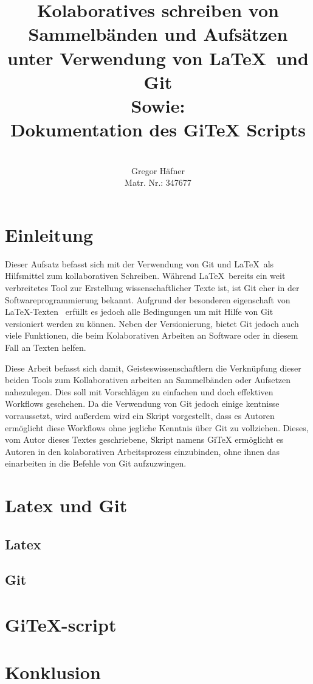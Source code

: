 \documentclass[12pt,a4paper]{scrartcl}
\author{\\ Gregor Häfner \\
{\small Matr. Nr.: 347677} }
\title{Kolaboratives schreiben von Sammelbänden und Aufsätzen unter Verwendung von \LaTeX ~und Git \bigskip \\ Sowie: \\ Dokumentation des GiTeX Scripts}
\begin{document}
\maketitle
\bigskip
\tableofcontents
\pagebreak

\section{Einleitung}

Dieser Aufsatz befasst sich mit der Verwendung von Git und \LaTeX \ als Hilfsmittel zum kollaborativen Schreiben. Während \LaTeX \ bereits ein weit verbreitetes Tool zur Erstellung wissenschaftlicher Texte ist, ist Git eher in der Softwareprogrammierung bekannt. Aufgrund der besonderen eigenschaft von \LaTeX -Texten \ erfüllt es jedoch alle Bedingungen um mit Hilfe von Git versioniert werden zu können. Neben der Versionierung, bietet Git jedoch auch viele Funktionen, die beim Kolaborativen Arbeiten an Software oder in diesem Fall an Texten helfen.

 Diese Arbeit befasst sich damit, Geisteswissenschaftlern die Verknüpfung dieser beiden Tools zum Kollaborativen arbeiten an Sammelbänden oder Aufsetzen nahezulegen. Dies soll mit Vorschlägen zu einfachen und doch effektiven Workflows geschehen. Da die Verwendung von Git jedoch einige kentnisse vorraussetzt, wird außerdem wird ein Skript vorgestellt, dass es Autoren ermöglicht diese Workflows ohne jegliche Kenntnis über Git zu vollziehen. Dieses, vom Autor dieses Textes geschriebene, Skript namens GiTeX ermöglicht es Autoren in den kolaborativen Arbeitsprozess einzubinden, ohne ihnen das einarbeiten in die Befehle von Git aufzuzwingen.

\section{Latex und Git}

\subsection{Latex}


\subsection{Git}


\section{GiTeX-script}



\section{Konklusion}
\end{document}
